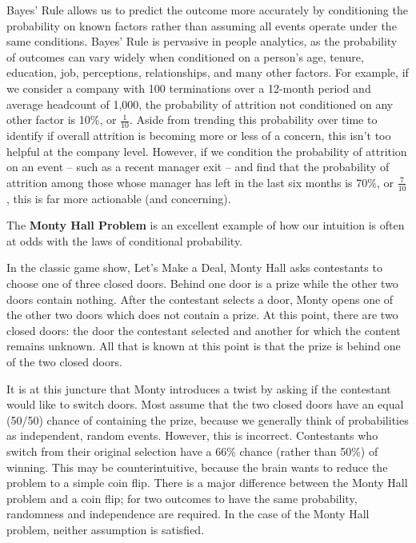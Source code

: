 \documentclass[
]{book}
\begin{document}
Bayes' Rule allows us to predict the outcome more accurately by conditioning the probability on known factors rather than assuming all events operate under the same conditions. Bayes' Rule is pervasive in people analytics, as the probability of outcomes can vary widely when conditioned on a person's age, tenure, education, job, perceptions, relationships, and many other factors. For example, if we consider a company with 100 terminations over a 12-month period and average headcount of 1,000, the probability of attrition not conditioned on any other factor is 10\%, or \(\frac{1}{10}\). Aside from trending this probability over time to identify if overall attrition is becoming more or less of a concern, this isn't too helpful at the company level. However, if we condition the probability of attrition on an event -- such as a recent manager exit -- and find that the probability of attrition among those whose manager has left in the last six months is 70\%, or \(\frac{7}{10}\), this is far more actionable (and concerning).

The \textbf{Monty Hall Problem} is an excellent example of how our intuition is often at odds with the laws of conditional probability.

In the classic game show, Let's Make a Deal, Monty Hall asks contestants to choose one of three closed doors. Behind one door is a prize while the other two doors contain nothing. After the contestant selects a door, Monty opens one of the other two doors which does not contain a prize. At this point, there are two closed doors: the door the contestant selected and another for which the content remains unknown. All that is known at this point is that the prize is behind one of the two closed doors.

It is at this juncture that Monty introduces a twist by asking if the contestant would like to switch doors. Most assume that the two closed doors have an equal (50/50) chance of containing the prize, because we generally think of probabilities as independent, random events. However, this is incorrect. Contestants who switch from their original selection have a 66\% chance (rather than 50\%) of winning. This may be counterintuitive, because the brain wants to reduce the problem to a simple coin flip. There is a major difference between the Monty Hall problem and a coin flip; for two outcomes to have the same probability, randomness and independence are required. In the case of the Monty Hall problem, neither assumption is satisfied.
\end{document}
